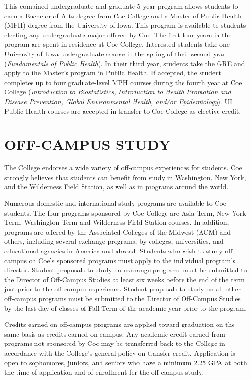 \documentclass[
  letterpaper,
]{scrbook}
\begin{document}
This combined undergraduate and graduate 5-year program allows students
to earn a Bachelor of Arts degree from Coe College and a Master of
Public Health (MPH) degree from the University of Iowa. This program is
available to students electing any undergraduate major offered by Coe.
The first four years in the program are spent in residence at Coe
College. Interested students take one University of Iowa undergraduate
course in the spring of their second year (\emph{Fundamentals of Public
Health}). In their third year, students take the GRE and apply to the
Master's program in Public Health. If accepted, the student completes up
to four graduate-level MPH courses during the fourth year at Coe College
(\emph{Introduction to Biostatistics, Introduction to Health Promotion
and Disease Prevention, Global Environmental Health, and/or
Epidemiology}). UI Public Health courses are accepted in transfer to Coe
College as elective credit.

\hypertarget{off-campus-study}{%
\chapter{OFF-CAMPUS STUDY}\label{off-campus-study}}

The College endorses a wide variety of off-campus experiences for
students. Coe strongly believes that students can benefit from study in
Washington, New York, and the Wilderness Field Station, as well as in
programs around the world.

Numerous domestic and international study programs are available to Coe
students. The four programs sponsored by Coe College are Asia Term, New
York Term, Washington Term and Wilderness Field Station courses. In
addition, programs are offered by the Associated Colleges of the Midwest
(ACM) and others, including several exchange programs, by colleges,
universities, and educational agencies in America and abroad. Students
who wish to study off-campus on Coe's sponsored programs must apply to
the individual program's director. Student proposals to study on
exchange programs must be submitted to the Director of Off-Campus
Studies at least six weeks before the end of the term just prior to the
off-campus experience. Student proposals to study on all other
off-campus programs must be submitted to the Director of Off-Campus
Studies by the last day of classes of Fall Term of the academic year
prior to the program.

Credits earned on off-campus programs are applied toward graduation on
the same basis as credits earned on campus. Any academic credit earned
from programs not sponsored by Coe may be transferred back to the
College in accordance with the College's general policy on transfer
credit. Application is open to sophomores, juniors, and seniors who have
a minimum 2.25 GPA at both the time of application and of enrollment for
the off-campus study.
\end{document}
